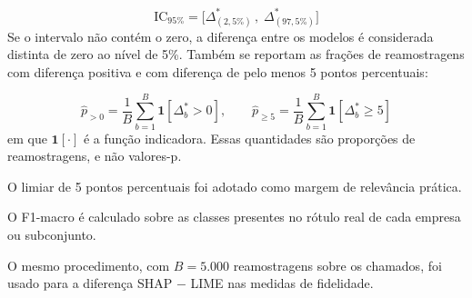 \documentclass[
    12pt,                %
    openright,           %
    oneside,             %
    a4paper,             %
    english,             %
    brazil               %
]{abntex2}
\begin{document}
\begin{equation}
\mathrm{IC}_{95\%} = \Big[ \Delta^{*}_{(2{,}5\%)}\,,\; \Delta^{*}_{(97{,}5\%)} \Big]
\label{eq:ic}
\end{equation}
Se o intervalo não contém o zero, a diferença entre os modelos é considerada distinta de zero ao nível de 5\%. Também se reportam as frações de reamostragens com diferença positiva e com diferença de pelo menos 5 pontos percentuais:

\begin{equation}
\hat{p}_{>0} = \frac{1}{B} \sum_{b=1}^{B} \mathbf{1}\left[\Delta_b^{*} > 0\right], \qquad
\hat{p}_{\ge 5} = \frac{1}{B} \sum_{b=1}^{B} \mathbf{1}\left[\Delta_b^{*} \ge 5\right]
\label{eq:frac-bootstrap}
\end{equation}
em que $\mathbf{1}[\cdot]$ é a função indicadora. Essas quantidades são proporções de reamostragens, e não valores-p.

O limiar de 5 pontos percentuais foi adotado como margem de relevância prática.

O F1-macro é calculado sobre as classes presentes no rótulo real de cada empresa ou subconjunto.

O mesmo procedimento, com $B = 5.000$ reamostragens sobre os chamados, foi usado para a diferença SHAP $-$ LIME nas medidas de fidelidade.
\end{document}

